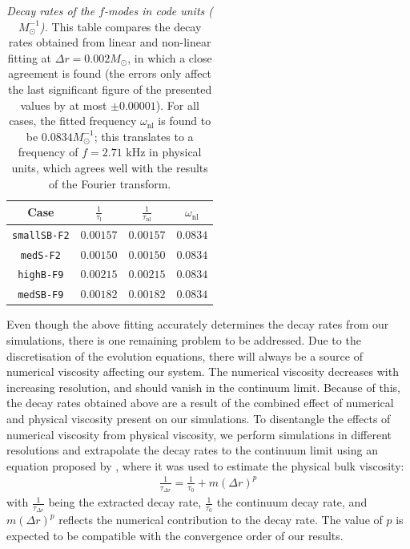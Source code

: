 \documentclass[prd,aps,twocolumn,floats,floatfix,nofootinbib,superscriptaddress] {revtex4-1}
\begin{document}
\begin{table}[!h] 
\begin{ruledtabular}
\begin{tabular}{c | c c c} 
 \hline
 Case & $\frac{1}{\tau_\text{l}}$ & $\frac{1}{\tau_\text{nl}}$ & $\omega_\text{nl}$ \\ [0.5ex] 
 \hline\hline
 \texttt{smallSB-F2} & $0.00157$ & $0.00157$ & $0.0834$ \\ 
 \hline
 \texttt{medS-F2} & $0.00150$ & $0.00150$ & $0.0834$ \\
 \hline
 \texttt{highB-F9} & $0.00215$ & $0.00215$ & $0.0834$ \\
 \hline
 \texttt{medSB-F9} & $0.00182$ & $0.00182$ & $0.0834$ \\
 \hline
\end{tabular}
\end{ruledtabular}
\caption{\emph{Decay rates of the $f$-modes in code units ($M_\odot^{-1}$).}  This table compares the decay rates obtained from linear and non-linear fitting at $\Delta r =0.002 M_\odot$, in which a close agreement is found (the errors only affect the last significant figure of the presented values by at most $\pm 0.00001$).  For all cases, the fitted frequency $\omega_{\text{nl}}$ is found to be $0.0834 M_\odot^{-1}$;  this translates to a frequency of $f=2.71$ kHz in physical units, which agrees well with the results of the Fourier transform.}
\label{QNM_decay_table}
\end{table}

Even though the above fitting accurately determines the decay rates from our simulations, there is one remaining problem to be addressed.  Due to the discretisation of the evolution equations, there will always be a source of numerical viscosity affecting our system.  The numerical viscosity decreases with increasing resolution, and should vanish in the continuum limit.  Because of this, the decay rates obtained above are  a result of the combined effect of numerical and physical viscosity present on our simulations.  To disentangle the effects of numerical viscosity from physical viscosity, we perform simulations in different resolutions and extrapolate the decay rates to the continuum limit using an equation proposed by \cite{Chabanov:2023abq}, where it was used to estimate the physical bulk viscosity:
\begin{align}\label{extrapolation_equation}
    \frac{1}{\tau_{\Delta r}} =\frac{1}{\tau_0}+m(\Delta r)^p
\end{align}
with $\frac{1}{\tau_{\Delta r}}$ being the extracted decay rate, $\frac{1}{\tau_0}$ the continuum decay rate, and $m(\Delta r)^p$ reflects the numerical contribution to the decay rate.  The value of $p$ is expected to be compatible with the convergence order of our results.
\end{document}
